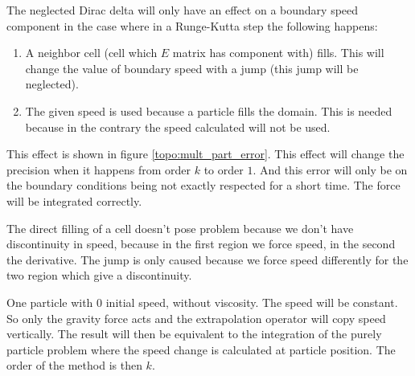 The neglected Dirac delta will only have an effect on a boundary speed component in the case where in a Runge-Kutta step the following happens:
\begin{enumerate}
	\item A neighbor cell (cell which $E$ matrix has component with) fills.
	This will change the value of boundary speed with a jump (this jump will be neglected).
	\item The given speed is used because a particle fills the domain.
	This is needed because in the contrary the speed calculated will not be used.
\end{enumerate}
This effect is shown in figure \ref{topo:mult_part_error}.
This effect will change the precision when it happens from order $k$ to order $1$.
And this error will only be on the boundary conditions being not exactly respected for a short time.
The force will be integrated correctly.

The direct filling of a cell doesn't pose problem because we don't have discontinuity in speed, because in the first region we force speed,
in the second the derivative.
The jump is only caused because we force speed differently for the two region which give a discontinuity.

\begin{example}
One particle with 0 initial speed, without viscosity.
The speed will be constant. So only the gravity force acts and the extrapolation operator will copy speed vertically.
The result will then be equivalent to the integration of the purely particle problem where the speed change is calculated at particle position.
The order of the method is then $k$.
\end{example}

